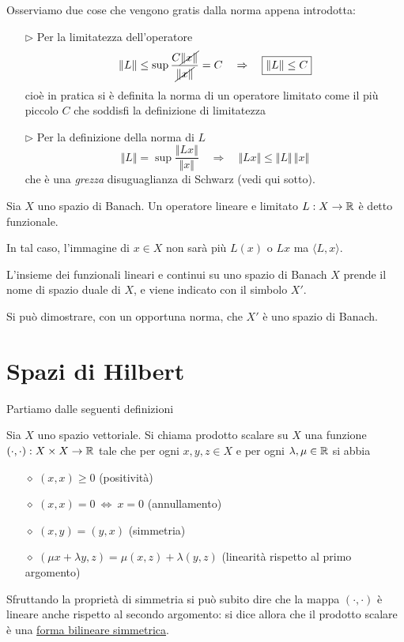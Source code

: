 Osserviamo due cose che vengono gratis dalla norma appena introdotta:
\begin{enumerate}
    \item [$\triangleright$] Per la limitatezza dell'operatore
    \begin{equation*}
    \Vert L\Vert\leq \sup \frac{C\cancel{\Vert x \Vert}}{\cancel{\Vert x\Vert}}= C \quad \Rightarrow \quad \boxed{\Vert L\Vert\leq C}
    \end{equation*}
    cioè in pratica si è definita la norma di un operatore limitato come il più piccolo $C$ che soddisfi la definizione di limitatezza
    \item [$\triangleright$] Per la definizione della norma di $L$
    \begin{equation*}
    \Vert L \Vert= \sup \frac{\Vert Lx \Vert}{\Vert x\Vert} \quad \Rightarrow \quad \boxed{\Vert Lx \Vert \leq \Vert L \Vert\,\Vert x\Vert}
    \end{equation*}
    che è una \textit{grezza} disuguaglianza di Schwarz (vedi qui sotto).
\end{enumerate}

\begin{defn}[Funzionale]
Sia $X$ uno spazio di Banach. Un operatore lineare e limitato $L:X\to\mathbb{R}$ è detto funzionale.
\end{defn}

In tal caso, l'immagine di $x\in X$ non sarà più $L(x)$ o $Lx$ ma $\langle L,x \rangle$.

\begin{defn}
L'insieme dei funzionali lineari e continui su uno spazio di Banach $X$ prende il nome di spazio duale di $X$, e viene indicato con il simbolo $X'$.
\end{defn}
Si può dimostrare, con un opportuna norma, che $X'$ è uno spazio di Banach.

\section{Spazi di Hilbert}

Partiamo dalle seguenti definizioni

\begin{defn}
Sia $X$ uno spazio vettoriale. Si chiama prodotto scalare su $X$ una funzione $(\cdot,\cdot):X\times X\to\mathbb{R}$ tale che per ogni $x,y,z\in X$ e per ogni $\lambda,\mu\in\mathbb{R}$ si abbia
\begin{enumerate}
    \item [$\diamond$] $(x,x)\geq 0$ (positività)
    \item [$\diamond$] $(x,x)=0\ \Leftrightarrow\ x=0$ (annullamento)
    \item [$\diamond$] $(x,y)=(y,x)$ (simmetria)
    \item [$\diamond$] $(\mu x+\lambda y,z)=\mu(x,z)+\lambda(y,z)$ (linearità rispetto al primo argomento)
\end{enumerate}
\end{defn}
Sfruttando la proprietà di simmetria si può subito dire che la mappa $(\cdot,\cdot)$ è lineare anche rispetto al secondo argomento: si dice allora che il prodotto scalare è una \underline{forma bilineare simmetrica}.

